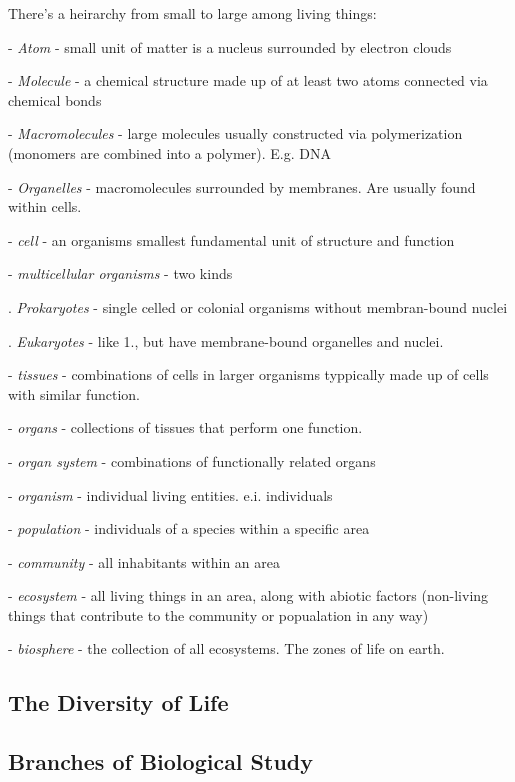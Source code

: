 \documentclass{article}
\theoremstyle{definition}
\begin{document}
There's a heirarchy from small to large among living things:

- \textit{Atom} - small unit of matter is a nucleus surrounded by electron clouds

- \textit{Molecule} - a chemical structure made up of at least two atoms connected via chemical bonds

- \textit{Macromolecules} - large molecules usually constructed via polymerization (monomers are combined into a polymer). E.g. DNA

- \textit{Organelles} - macromolecules surrounded by membranes. Are usually found within cells.

- \textit{cell} - an organisms smallest fundamental unit of structure and function

- \textit{multicellular organisms} - two kinds

\indent{}. \textit{Prokaryotes} - single celled or colonial organisms without membran-bound nuclei

\indent{}. \textit{Eukaryotes} - like 1., but have membrane-bound organelles and nuclei.

- \textit{tissues} - combinations of cells in larger organisms typpically made up of cells with similar function.

- \textit{organs} - collections of tissues that perform one function.

- \textit{organ system} - combinations of functionally related organs

- \textit{organism} - individual living entities. e.i. individuals

- \textit{population} - individuals of a species within a specific area

- \textit{community} - all inhabitants within an area

- \textit{ecosystem} - all living things in an area, along with abiotic factors (non-living things that contribute to the community or popualation in any way)

- \textit{biosphere} -  the collection of all ecosystems. The zones of life on earth.

\subsection{The Diversity of Life}

\subsection{Branches of Biological Study}
\end{document}
